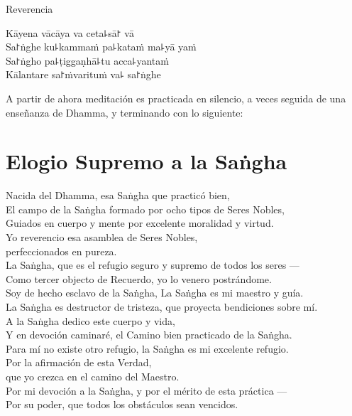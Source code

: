 \enlargethispage{\baselineskip}

\vfill

\begin{instruction}
  Reverencia
\end{instruction}

Kāyena vācāya va ceta꜕sā꜓ vā\\
Sa꜓ṅghe ku꜕kammaṁ pa꜕kataṁ ma꜕yā yaṁ\\
Sa꜓ṅgho pa꜕ṭiggaṇhā꜕tu acca꜕yantaṁ\\
Kālantare sa꜓ṁvarituṁ va꜕ sa꜓ṅghe

\vfill

\begin{instruction}
  A partir de ahora meditación es practicada en silencio, a veces seguida de una enseñanza de Dhamma, y terminando con lo siguiente:
\end{instruction}

\clearpage

\nextChapterUseDelegatedPageNumber

\chapter{Elogio Supremo a la Saṅgha}

\begin{leader}
\end{leader}

Nacida del Dhamma, esa Saṅgha que practicó bien,\\
El campo de la Saṅgha formado por ocho tipos de Seres Nobles,\\
Guiados en cuerpo y mente por excelente moralidad y virtud.\\
Yo reverencio esa asamblea de Seres Nobles,\\
\vin perfeccionados en pureza.\\
La Saṅgha, que es el refugio seguro y supremo de todos los seres ---\\
Como tercer objecto de Recuerdo, yo lo venero postrándome.\\
Soy de hecho esclavo de la Saṅgha, La Saṅgha es mi maestro y guía.\\
La Saṅgha es destructor de tristeza, que proyecta bendiciones sobre mí.\\
A la Saṅgha dedico este cuerpo y vida,\\
Y en devoción caminaré, el Camino bien practicado de la Saṅgha.\\
Para mí no existe otro refugio, la Saṅgha es mi excelente refugio.\\
Por la afirmación de esta Verdad,\\
\vin que yo crezca en el camino del Maestro.\\
Por mi devoción a la Saṅgha, y por el mérito de esta práctica ---\\
Por su poder, que todos los obstáculos sean vencidos.

